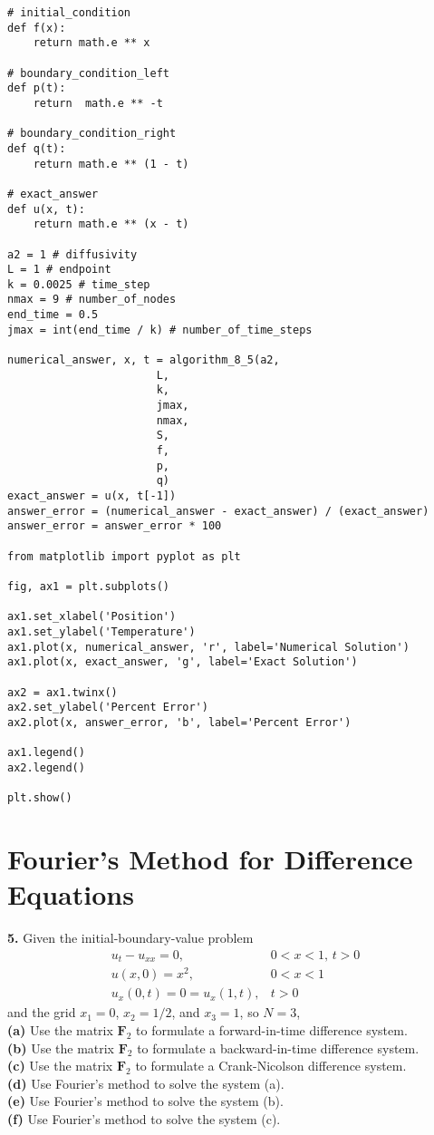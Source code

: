\documentclass{amsbook}%
\theoremstyle{plain}
\numberwithin{equation}{section}
\begin{document}
\begin{small}
\begin{verbatim}
# initial_condition
def f(x):
    return math.e ** x

# boundary_condition_left
def p(t):
    return  math.e ** -t

# boundary_condition_right
def q(t):
    return math.e ** (1 - t)

# exact_answer	
def u(x, t):
	return math.e ** (x - t)

a2 = 1 # diffusivity
L = 1 # endpoint
k = 0.0025 # time_step
nmax = 9 # number_of_nodes
end_time = 0.5
jmax = int(end_time / k) # number_of_time_steps

numerical_answer, x, t = algorithm_8_5(a2,
                       L,
                       k,
                       jmax,
                       nmax,
                       S,
                       f,
                       p,
                       q)
exact_answer = u(x, t[-1])
answer_error = (numerical_answer - exact_answer) / (exact_answer)
answer_error = answer_error * 100

from matplotlib import pyplot as plt

fig, ax1 = plt.subplots()

ax1.set_xlabel('Position')
ax1.set_ylabel('Temperature')
ax1.plot(x, numerical_answer, 'r', label='Numerical Solution')
ax1.plot(x, exact_answer, 'g', label='Exact Solution')

ax2 = ax1.twinx()
ax2.set_ylabel('Percent Error')
ax2.plot(x, answer_error, 'b', label='Percent Error')

ax1.legend()
ax2.legend()

plt.show()
\end{verbatim}
\end{small}

	\section{Fourier's Method for Difference Equations}
	
		\noindent\textbf{5.} Given the initial-boundary-value problem
		\begin{align}
			u_t-u_{xx}=0, & 0<x<1,\, t>0\\
			u(x,0)=x^2, & 0<x<1\\
			u_x(0,t)=0=u_x(1,t), & t>0
		\end{align}
		and the grid $x_1=0$, $x_2=1/2$, and $x_3=1$, so $N=3$,\\
		\textbf{(a)} Use the matrix $\mathbf{F}_2$ to formulate a forward-in-time difference system.\\
		\textbf{(b)} Use the matrix $\mathbf{F}_2$ to formulate a backward-in-time difference system.\\
		\textbf{(c)} Use the matrix $\mathbf{F}_2$ to formulate a Crank-Nicolson difference system.\\
		\textbf{(d)} Use Fourier's method to solve the system (a).\\
		\textbf{(e)} Use Fourier's method to solve the system (b).\\
		\textbf{(f)} Use Fourier's method to solve the system (c).\\[12pt]
\end{document}
